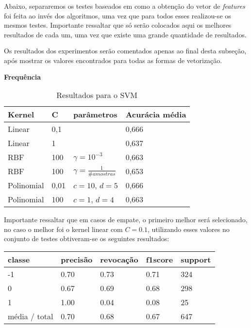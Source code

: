 Abaixo, separaremos os testes baseados em como a obtenção do vetor de \textit{features} foi feita
ao invés dos algoritmos, uma vez que para todos esses realizou-se os mesmos testes. Importante 
ressaltar que só serão colocados aqui os melhores resultados de cada um, uma vez que existe uma
grande quantidade de resultados. 

Os resultados dos experimentos serão comentados apenas ao final desta subseção, após mostrar
os valores encontrados para todas as formas de vetorização.


\textbf{Frequência}

\begin{table}[H]
	\centering
	\caption{Resultados para o SVM}
	\begin{tabular}{l l l l}
		\hline
		Kernel & C & parâmetros & Acurácia média \\
		\hline
		Linear & 0,1 & & 0,666 \\
		\hline
		Linear & 1 & & 0,637 \\
		\hline
		RBF & 100 & $\gamma = 10^{-3}$ & 0,663 \\
		\hline
		RBF & 100 & $\gamma = \frac{1}{\# amostras}$ & 0,653 \\
		\hline
		Polinomial & 0,01 & $c = 10$, $d = 5$ & 0,666 \\
		\hline
		Polinomial & 100 & $c = 1$, $d = 4$ & 0,663 \\
		\hline
	\end{tabular}
\end{table}

Importante ressaltar que em casos de empate, o primeiro melhor será selecionado, no caso o melhor
foi o kernel linear com $C = 0.1$, utilizando esses valores no conjunto de testes obtiveram-se os 
seguintes resultados:

\begin{table}[H]
	\centering
		\begin{tabular}{l | l | l | l | l}
		\hline
		classe  	&	precisão  &  revocação &  f1\-score &  support \\
		\hline		
		 -1     &  0.70  &    0.73   &   0.71   &    324 \\
		  \hline
          0     &  0.67   &   0.69   &   0.68    &   298 \\
          \hline
          1     &  1.00   &   0.04   &   0.08    &    25 \\
			\hline
		média / total     &  0.70  &    0.68  &    0.67   &    647 \\
		\hline
	\end{tabular}
\end{table}


